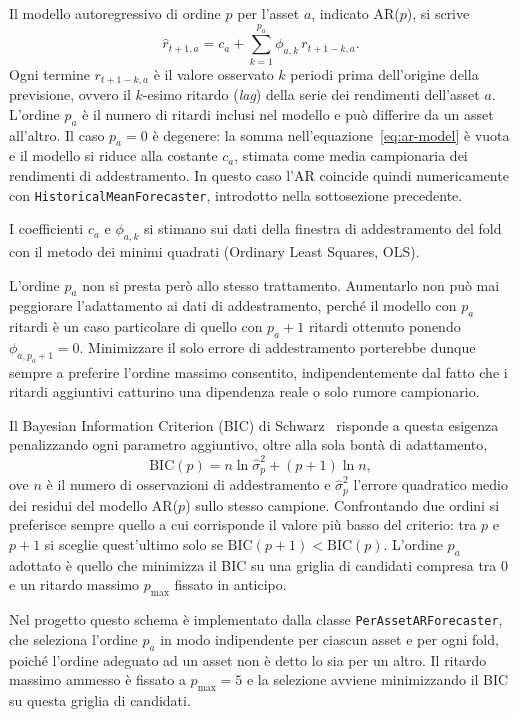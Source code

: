 Il modello autoregressivo di ordine $p$ per l'asset $a$, indicato AR($p$), si scrive
\begin{equation}
\label{eq:ar-model}
\hat r_{t+1,a} = c_a + \sum_{k=1}^{p_a} \phi_{a,k}\, r_{t+1-k,a}.
\end{equation}
Ogni termine $r_{t+1-k,a}$ è il valore osservato $k$ periodi prima dell'origine della previsione, ovvero il $k$-esimo ritardo (\emph{lag}) della serie dei rendimenti dell'asset $a$. L'ordine $p_a$ è il numero di ritardi inclusi nel modello e può differire da un asset all'altro. Il caso $p_a=0$ è degenere: la somma nell'equazione~\eqref{eq:ar-model} è vuota e il modello si riduce alla costante $c_a$, stimata come media campionaria dei rendimenti di addestramento. In questo caso l'AR coincide quindi numericamente con \texttt{HistoricalMeanForecaster}, introdotto nella sottosezione precedente.

I coefficienti $c_a$ e $\phi_{a,k}$ si stimano sui dati della finestra di addestramento del fold con il metodo dei minimi quadrati (Ordinary Least Squares, OLS).

L'ordine $p_a$ non si presta però allo stesso trattamento. Aumentarlo non può mai peggiorare l'adattamento ai dati di addestramento, perché il modello con $p_a$ ritardi è un caso particolare di quello con $p_a+1$ ritardi ottenuto ponendo $\phi_{a,p_a+1}=0$. Minimizzare il solo errore di addestramento porterebbe dunque sempre a preferire l'ordine massimo consentito, indipendentemente dal fatto che i ritardi aggiuntivi catturino una dipendenza reale o solo rumore campionario.

Il Bayesian Information Criterion (BIC) di Schwarz~\cite{schwarz1978estimating} risponde a questa esigenza penalizzando ogni parametro aggiuntivo, oltre alla sola bontà di adattamento,
\begin{equation}
\label{eq:bic}
\mathrm{BIC}(p) = n\ln\hat\sigma_p^2 + (p+1)\ln n,
\end{equation}
ove $n$ è il numero di osservazioni di addestramento e $\hat\sigma_p^2$ l'errore quadratico medio dei residui del modello AR($p$) sullo stesso campione. Confrontando due ordini si preferisce sempre quello a cui corrisponde il valore più basso del criterio: tra $p$ e $p+1$ si sceglie quest'ultimo solo se $\mathrm{BIC}(p+1) < \mathrm{BIC}(p)$. L'ordine $p_a$ adottato è quello che minimizza il BIC su una griglia di candidati compresa tra $0$ e un ritardo massimo $p_{\max}$ fissato in anticipo.

Nel progetto questo schema è implementato dalla classe \texttt{PerAssetARForecaster}, che seleziona l'ordine $p_a$ in modo indipendente per ciascun asset e per ogni fold, poiché l'ordine adeguato ad un asset non è detto lo sia per un altro. Il ritardo massimo ammesso è fissato a $p_{\max}=5$ e la selezione avviene minimizzando il BIC su questa griglia di candidati.

